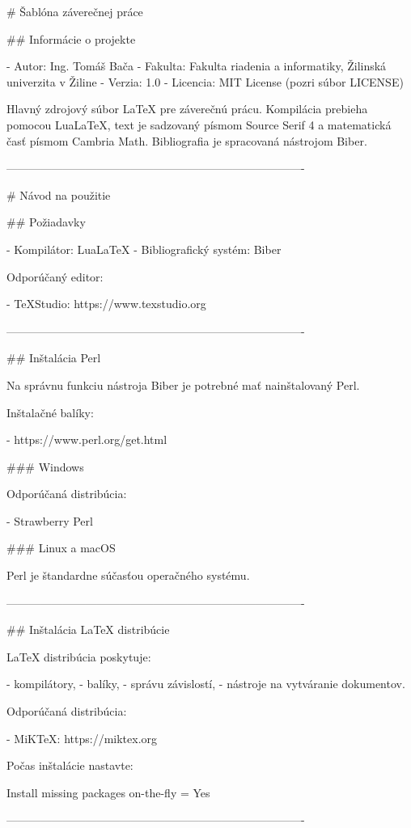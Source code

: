 \iffalse
# Šablóna záverečnej práce

## Informácie o projekte

- Autor: Ing. Tomáš Bača
- Fakulta: Fakulta riadenia a informatiky, Žilinská univerzita v Žiline
- Verzia: 1.0
- Licencia: MIT License (pozri súbor LICENSE)

Hlavný zdrojový súbor LaTeX pre záverečnú prácu. Kompilácia prebieha pomocou LuaLaTeX, text je sadzovaný písmom Source Serif 4 a matematická časť písmom Cambria Math. Bibliografia je spracovaná nástrojom Biber.

-------------------------------------------------------------------------------

# Návod na použitie

## Požiadavky

- Kompilátor: LuaLaTeX
- Bibliografický systém: Biber

Odporúčaný editor:

- TeXStudio: https://www.texstudio.org

-------------------------------------------------------------------------------

## Inštalácia Perl

Na správnu funkciu nástroja Biber je potrebné mať nainštalovaný Perl.

Inštalačné balíky:

- https://www.perl.org/get.html

### Windows

Odporúčaná distribúcia:

- Strawberry Perl

### Linux a macOS

Perl je štandardne súčasťou operačného systému.

-------------------------------------------------------------------------------

## Inštalácia LaTeX distribúcie

LaTeX distribúcia poskytuje:

- kompilátory,
- balíky,
- správu závislostí,
- nástroje na vytváranie dokumentov.

Odporúčaná distribúcia:

- MiKTeX: https://miktex.org

Počas inštalácie nastavte:

Install missing packages on-the-fly = Yes

-------------------------------------------------------------------------------

